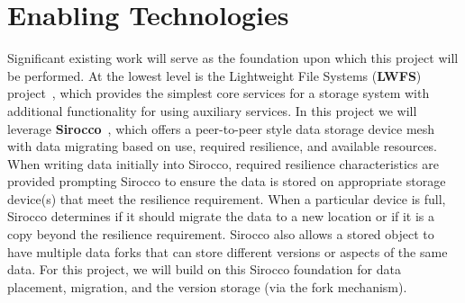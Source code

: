 \section{Enabling Technologies}
\label{sec:enabling-technologies}
Significant existing work will serve as the foundation upon which this project
will be performed.
At the lowest level is the Lightweight File Systems ({\bf LWFS}) project~\cite{oldfield:lwfs},
which provides the simplest core services for a storage system with additional functionality
for using auxiliary services.
%
In this project we will leverage {\bf Sirocco}~\cite{sirocco}, which  offers a peer-to-peer style data storage device
mesh with data migrating based on use, required resilience, and available
resources. When writing data initially into Sirocco, required
resilience characteristics are provided prompting Sirocco to ensure the data is
stored on appropriate storage device(s) that meet the resilience requirement.
When a particular device is full, Sirocco determines if it should migrate the
data to a new location or if it is a copy beyond the resilience requirement. Sirocco also allows
a stored object to have multiple data forks that can
store different versions or aspects of the same data.  For this project, we
will build on this Sirocco foundation for data placement, migration, and the
version storage (via the fork mechanism). 


